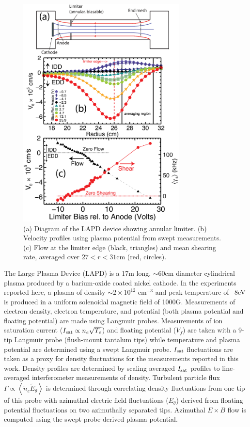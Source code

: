 \documentclass[aip,pop,amsmath,amssymb,reprint,superscriptaddress]{revtex4-1} %
\begin{document}
\begin{figure}[!htbp]
\centerline{
\includegraphics[width=8.5cm]{figure1.eps}}
\caption{\label{fig:velocity_flowshear} (a) Diagram of the LAPD device showing annular limiter.  (b) Velocity profiles using plasma potential from swept measurements. (c) Flow at the limiter edge (black, triangles) and mean shearing rate, averaged over $27 < r < 31$cm (red, circles).}
\end{figure}

The Large Plasma Device \cite{gek91} (LAPD) is a 17m long, $\sim$60cm diameter cylindrical plasma produced by a barium-oxide coated nickel cathode. In the experiments reported here, a plasma of density $\sim$$2 \times 10^{12}$ cm$^{-3}$ and peak temperature of ~8eV is produced in a uniform solenoidal magnetic field of 1000G.  Measurements of electron density, electron temperature, and potential (both plasma potential and floating potential) are made using Langmuir probes.   Measurements of ion saturation current ($I_{\rm sat} \propto n_e \sqrt{T_e}$) and floating potential ($V_f$) are taken with a 9-tip Langmuir probe (flush-mount tantalum tips) while temperature and plasma potential are determined using a swept Langmuir probe. $I_{\rm sat}$ fluctuations are taken as a proxy for density fluctuations for the measurements reported in this work. Density profiles are determined by scaling averaged $I_{\rm sat}$ profiles to line-averaged interferometer measurements of density.  Turbulent particle flux $\Gamma \propto \left<\tilde{n}_e \tilde{E}_\theta\right>$ is determined through correlating density fluctuations from one tip of this probe with azimuthal electric field fluctuations ($E_\theta$) derived from floating potential fluctuations on two azimuthally separated tips. Azimuthal $E\times B$ flow is computed using the swept-probe-derived plasma potential. 
\end{document}
